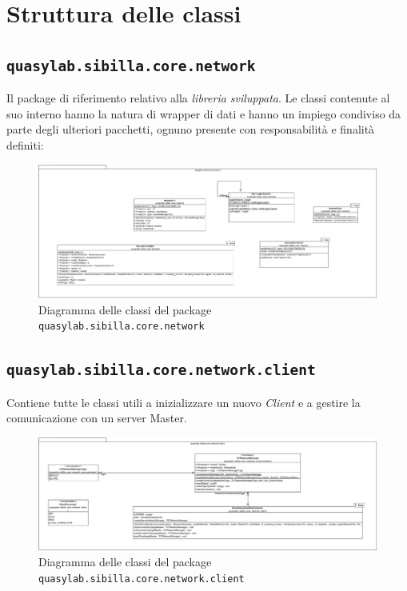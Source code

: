 

\section{Struttura delle classi}

\subsection{\texttt{quasylab.sibilla.core.network}}
Il package di riferimento relativo alla \emph{libreria sviluppata}. Le classi contenute al suo interno hanno la natura di wrapper di dati e hanno un impiego condiviso da parte degli ulteriori pacchetti, ognuno presente con responsabilità e finalità definiti:

\begin{figure}[H]
  \includegraphics[width=\linewidth]{images/quasylab.sibilla.core.network.png}
  \captionsetup{justification=centering}
  \caption{Diagramma delle classi del package \texttt{quasylab.sibilla.core.network}}
\end{figure}

\subsection{\texttt{quasylab.sibilla.core.network.client}} Contiene tutte le classi utili a inizializzare un nuovo \emph{Client} e a gestire la comunicazione con un server Master.

\begin{figure}[H]
    \includegraphics[width=\linewidth]{images/quasylab.sibilla.core.network.client.png}
    \captionsetup{justification=centering}
    \caption{Diagramma delle classi del package \texttt{quasylab.sibilla.core.network.client}}
  \end{figure}

